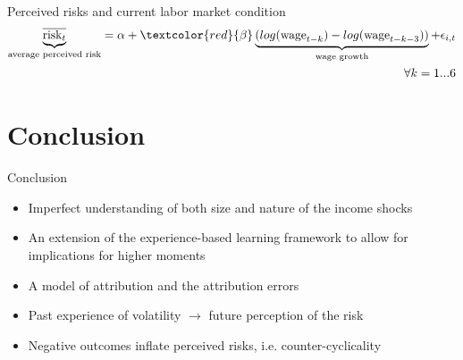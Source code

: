 \documentclass{beamer}
\begin{document}
\begin{frame}{Perceived risks and current labor market condition}
		\begin{eqnarray*}
		\underbrace{\overline{\text{risk}_{t}}}_{\text{average perceived risk}} = \alpha + \textcolor{red}{\beta} \underbrace{(log(\text{wage}_{t-k}) - log(\text{wage}_{t-k-3}))}  _{\text{wage growth}}  + \epsilon_{i,t}	 \\
		\quad \forall k =1...6
	\end{eqnarray*}

\begin{table}
	\centering
	\label{macro_corr_he}
\end{table}

\end{frame}

\section{Conclusion}

\begin{frame}{Conclusion}
\begin{itemize}
	\item Imperfect understanding of both size and nature of the income shocks
\item An extension of the experience-based learning framework to allow for implications for higher moments
\item A model of attribution and the attribution errors
\item Past experience of volatility $\rightarrow$ future perception of the risk 
\item Negative outcomes inflate perceived risks, i.e. counter-cyclicality  
\end{itemize}
\end{frame}



\end{document}
